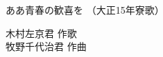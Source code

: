 \documentclass[10pt,b5j]{tarticle} %
\begin{document}
\begin{minipage}[c]{0.7\hsize} %
    \begin{center}
        {\LARGE
            ああ青春の歓喜を %
        }
        {\small 
            （大正15年寮歌） %
        }
    \end{center}
\end{minipage}
\begin{minipage}[c]{0.3\hsize} %
    \begin{flushright} %
        木村左京君 作歌\\牧野千代治君 作曲 %
    \end{flushright}
\end{minipage}
\end{document}
